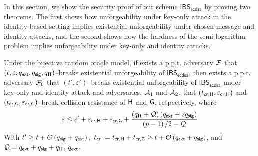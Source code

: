 \documentclass[version=submission, floatrow]{iacrcc}
\begin{document}
In this section, we show the security proof of our scheme $\mathsf{IBS}_{\mathsf{ecdsa}}$ by proving two theorems. The first shows how unforgeability under key-only attack in the identity-based setting implies existential unforgeability under chosen-message and identity attacks, and the second shows how the hardness of the semi-logarithm problem implies unforgeability under key-only and identity attacks.

\begin{theorem}\label{thm:euf}
    Under the bijective random oracle model, if exists a p.p.t. adversary $\mathcal{F}$ that $\left(t, \varepsilon, q_{\mathsf{ext}}, q_{\mathsf{sig}}, q_{\Pi} \right)$--breaks existential unforgeability of $\mathsf{IBS}_{\mathsf{ecdsa}}$, then exists a p.p.t. adversary $\mathcal{F}_{0}$ that $\left(t', \varepsilon'\right)$--breaks existential unforgeability of $\mathsf{IBS}_{\mathsf{ecdsa}}$ under key-only and identity attack and adversaries, $\mathcal{A}_{1}$ and $\mathcal{A}_{2}$, that $\left(t_{\mathsf{cr}, \mathsf{H}}, \varepsilon_{\mathsf{cr}, \mathsf{H}}\right)$ and $\left(t_{\mathsf{cr}, \mathsf{G}}, \varepsilon_{\mathsf{cr}, \mathsf{G}}\right)$--break collision resistance of $\mathsf{H}$ and $\mathsf{G}$, respectively, where
    \begin{equation}\label{eq: thm1}
         \varepsilon \le \varepsilon' + \varepsilon_{\mathsf{cr}, \mathsf{H}} + \varepsilon_{\mathsf{cr}, \mathsf{G}} + \dfrac{\left(q_{\Pi} + \mathcal{Q}\right)\left(q_{\mathsf{ext}} + 2q_{\mathsf{sig}}\right)}{\left(p-1\right)/2 - \mathcal{Q}} 
    \end{equation}
    With $t' \ge t + \mathcal{O}\left(\SignatureQueries + \ExtractionQueries\right),\ t_{\mathsf{cr}} := t_{\mathsf{cr}, \HashFunctionH} + t_{\mathsf{cr}, \HashFunctionG} \ge t + \mathcal{O}\left(\ExtractionQueries + \SignatureQueries\right)$, and $\mathcal{Q} = q_{\mathsf{ext}} + q_{\mathsf{sig}} + q_{\Pi}$, $q_{\mathsf{ext}}$.
\end{theorem}
\end{document}
